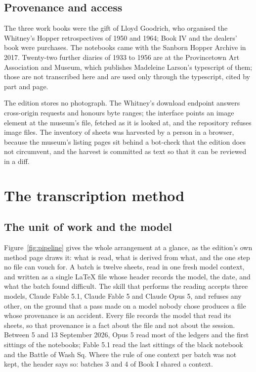 \documentclass[11pt]{article}
\begin{document}
\subsection{Provenance and access}

The three work books were the gift of Lloyd Goodrich, who organised the Whitney's Hopper retrospectives of 1950 and 1964; Book IV and the dealers' book were purchases. The notebooks came with the Sanborn Hopper Archive in 2017. Twenty-two further diaries of 1933 to 1956 are at the Provincetown Art Association and Museum, which publishes Madeleine Larson's typescript of them; those are not transcribed here and are used only through the typescript, cited by part and page.

The edition stores no photograph. The Whitney's download endpoint answers cross-origin requests and honours byte ranges; the interface points an image element at the museum's file, fetched as it is looked at, and the repository refuses image files. The inventory of sheets was harvested by a person in a browser, because the museum's listing pages sit behind a bot-check that the edition does not circumvent, and the harvest is committed as text so that it can be reviewed in a diff.

\section{The transcription method}



\subsection{The unit of work and the model}

Figure~\ref{fig:pipeline} gives the whole arrangement at a glance, as the edition's own method page draws it: what is read, what is derived from what, and the one step no file can vouch for. A batch is twelve sheets, read in one fresh model context, and written as a single LaTeX file whose header records the model, the date, and what the batch found difficult. The skill that performs the reading accepts three models, Claude Fable 5.1, Claude Fable 5 and Claude Opus 5, and refuses any other, on the ground that a pass made on a model nobody chose produces a file whose provenance is an accident. Every file records the model that read its sheets, so that provenance is a fact about the file and not about the session. Between 5 and 13 September 2026, Opus 5 read most of the ledgers and the first sittings of the notebooks; Fable 5.1 read the last sittings of the black notebook and the Battle of Wash Sq. Where the rule of one context per batch was not kept, the header says so: batches 3 and 4 of Book I shared a context.
\end{document}
